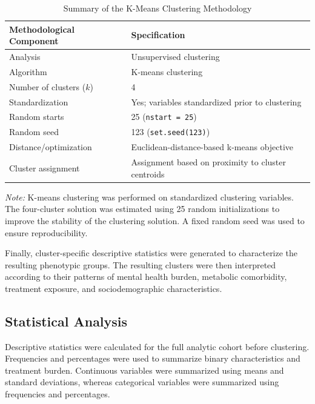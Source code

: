 \documentclass[11pt]{article}
\begin{document}
\begin{table}[H]
\centering
\caption{Summary of the K-Means Clustering Methodology}
\label{tab:kmeans_methodology}
\begin{tabular}{ll}
\toprule
\textbf{Methodological Component} & \textbf{Specification} \\
\midrule
Analysis & Unsupervised clustering \\
Algorithm & K-means clustering \\
Number of clusters ($k$) & 4 \\
Standardization & Yes; variables standardized prior to clustering \\
Random starts & 25 (\texttt{nstart = 25}) \\
Random seed & 123 (\texttt{set.seed(123)}) \\
Distance/optimization & Euclidean-distance-based k-means objective \\
Cluster assignment & Assignment based on proximity to cluster centroids \\
\bottomrule
\end{tabular}

\vspace{2mm}
\begin{minipage}{0.90\textwidth}
\footnotesize
\textit{Note:} K-means clustering was performed on standardized clustering variables. 
The four-cluster solution was estimated using 25 random initializations to improve 
the stability of the clustering solution. A fixed random seed was used to ensure 
reproducibility.
\end{minipage}
\end{table}


Finally, cluster-specific descriptive statistics were generated to characterize the resulting phenotypic groups. The resulting clusters were then interpreted according to their patterns of mental health burden, metabolic comorbidity, treatment exposure, and sociodemographic characteristics.


\subsection{Statistical Analysis}

Descriptive statistics were calculated for the full analytic cohort before clustering. Frequencies and percentages were used to summarize binary characteristics and treatment burden. Continuous variables were summarized using means and standard deviations, whereas categorical variables were summarized using frequencies and percentages. 
\end{document}
